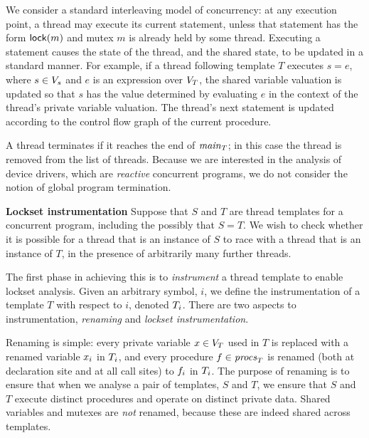 We consider a standard interleaving model of concurrency: at any
execution point, a thread may execute its current statement, unless
that statement has the form $\mathsf{lock}(m)$ and mutex $m$ is already held
by some thread.  Executing a statement causes the state of the thread,
and the shared state, to be updated in a standard manner.  For
example, if a thread following template $T$ executes $s = e$, where $s
\in V_s$ and $e$ is an expression over $V_{T}$, the
shared variable valuation is updated so that $s$ has the value
determined by evaluating $e$ in the context of the thread's private
variable valuation.  The thread's next statement is updated according
to the control flow graph of the current procedure.

A thread terminates if it reaches the end of $\mathit{main}_{T}$; in this
case the thread is removed from the list of threads.  Because we are
interested in the analysis of device drivers, which are
\emph{reactive} concurrent programs, we do not consider the notion of
global program termination.

\medskip\noindent\textbf{Lockset instrumentation }
Suppose that $S$ and $T$ are thread templates for a concurrent program, including the possibly that $S=T$.
We wish to check whether it is possible for a thread that is an instance of $S$ to race with a thread that is
an instance of $T$, in the presence of arbitrarily many further threads.

The first phase in achieving this is to \emph{instrument} a thread template to enable lockset analysis.  Given an arbitrary symbol, $i$, we define the instrumentation of a
template $T$ with respect to $i$, denoted $T_{i}$.  There are two aspects to instrumentation, \emph{renaming} and \emph{lockset instrumentation}.

Renaming is simple: every private variable $x \in V_{T}$ used in $T$ is replaced with a renamed variable $x_{i}$ in $T_{i}$, and every procedure $f \in \mathit{procs}_{T}$ is renamed (both at declaration site and at all call sites) to $f_{i}$ in $T_{i}$.  The purpose of renaming is to ensure that when we analyse a pair of templates, $S$ and $T$, we ensure that $S$ and $T$ execute distinct procedures and operate on distinct private data.  Shared variables and mutexes are \emph{not} renamed, because these are indeed shared across templates.

